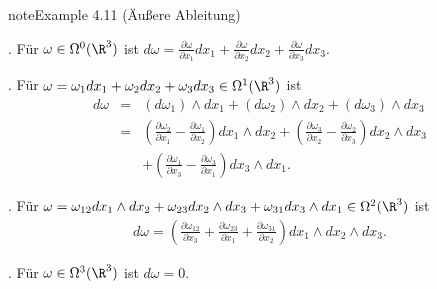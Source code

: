 \documentclass[letterpaper,10pt,german]{jupyterBook}
\begin{document}
\begin{sphinxadmonition}{note}{Example 4.11 (Äußere Ableitung)}



. Für \(\omega\in\Omega^0(\R^3)\) ist \(d\omega = \frac{\partial\omega}{\partial x_1}dx_1+
\frac{\partial\omega}{\partial x_2}dx_2+\frac{\partial\omega}{\partial x_3}dx_3\).



. Für \(\omega = \omega_1dx_1+\omega_2dx_2+\omega_3dx_3\in\Omega^1(\R^3)\) ist
\begin{equation*}
\begin{split}d\omega &=& (d\omega_1)\wedge dx_1+(d\omega_2)\wedge dx_2+(d\omega_3)\wedge
dx_3\\
&=& \left(\frac{\partial\omega_2}{\partial x_1}-\frac{\partial\omega_1}{\partial x_2}\right)
dx_1\wedge dx_2+ \left(\frac{\partial\omega_3}{\partial x_2}-\frac{\partial\omega_2}{\partial x_3}\right)
dx_2\wedge dx_3\\
&& + \left(\frac{\partial\omega_1}{\partial x_3}-\frac{\partial\omega_3}{\partial x_1}\right)
dx_3\wedge dx_1.\end{split}
\end{equation*}


. Für \(\omega = \omega_{12}dx_1\wedge dx_2+\omega_{23}dx_2\wedge dx_3
+\omega_{31}dx_3\wedge dx_1 \in\Omega^2(\R^3)\) ist
\begin{equation*}
\begin{split}d\omega = \left(\frac{\partial\omega_{12}}{\partial x_3} + \frac{\partial\omega_{23}}{\partial x_1}
+ \frac{\partial\omega_{31}}{\partial x_2}\right)dx_1\wedge dx_2\wedge dx_3.\end{split}
\end{equation*}


. Für \(\omega\in\Omega^3(\R^3)\) ist \(d\omega=0\).
\end{sphinxadmonition}
\end{document}
